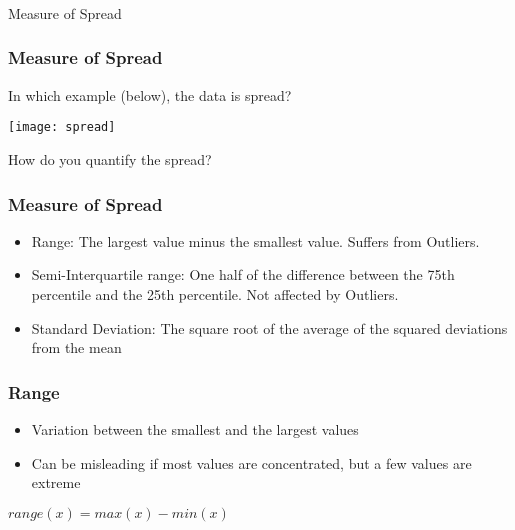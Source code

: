 \begin{frame}[fragile]\frametitle{}
\begin{center}
{\Large Measure of Spread}
\end{center}
\end{frame}

\begin{frame}[fragile]\frametitle{Measure of Spread}	

In which example (below), the data is spread?

\begin{center}
\texttt{[image: spread]}
\end{center}

How do you quantify the spread?

\end{frame}


\begin{frame}[fragile]\frametitle{Measure of Spread}	

\begin{itemize}
\item Range: The largest value minus the smallest value. Suffers from Outliers.
\item Semi-Interquartile range: One half of the difference between the 75th percentile and the 25th percentile. Not affected by Outliers.
\item Standard Deviation:	The square root of the average of the squared deviations from the mean
\end{itemize}


\end{frame}



\begin{frame}[fragile]\frametitle{Range}	
\begin{itemize}
\item Variation between the smallest and the largest values
\item Can be misleading if most values are concentrated, but a few values are extreme
\end{itemize}
$range(x) = max(x) - min(x)$

\end{frame}

